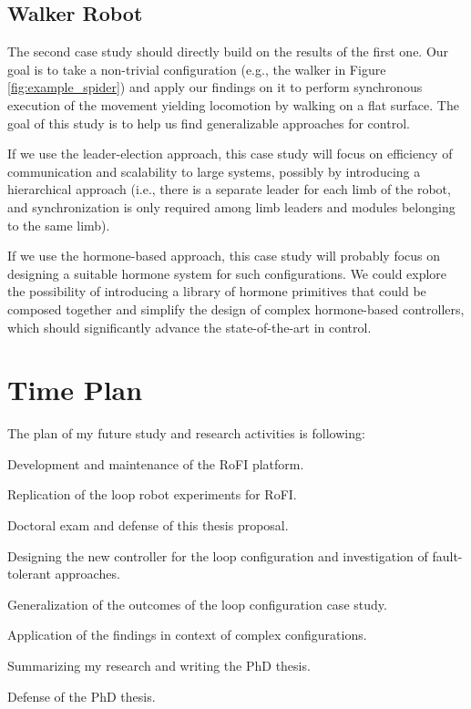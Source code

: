 \subsection{Walker Robot}

The second case study should directly build on the results of the first one. Our
goal is to take a non-trivial configuration (e.g., the walker in Figure
\ref{fig:example_spider}) and apply our findings on it to perform synchronous
execution of the movement yielding locomotion by walking on a flat surface. The
goal of this study is to help us find generalizable approaches for control.

If we use the leader-election approach, this case study will focus on efficiency
of communication and scalability to large systems, possibly by introducing a
hierarchical approach (i.e., there is a separate leader for each limb of the
robot, and synchronization is only required among limb leaders and modules
belonging to the same limb).

If we use the hormone-based approach, this case study will probably focus on
designing a suitable hormone system for such configurations. We could explore
the possibility of introducing a library of hormone primitives that could be
composed together and simplify the design of complex hormone-based controllers,
which should significantly advance the state-of-the-art in control.

\section{Time Plan}

The plan of my future study and research activities is following:

\begin{description}[style=nextline,leftmargin=0.8cm]
    \item [now -- January 2023]
        Development and maintenance of the RoFI platform.
    \item [now -- January 2021]
        Replication of the loop robot experiments for RoFI.
    \item [January 2021]
        Doctoral exam and defense of this thesis proposal.
    \item [February 2021 -- June 2021]
        Designing the new controller for the loop configuration and
        investigation of fault-tolerant approaches.
    \item [June 2021 -- December 2022]
        Generalization of the outcomes of the loop configuration case study.
    \item[January 2022 -- August 2022]
        Application of the findings in context of complex configurations.
    \item[September 2022 -- January 2023]
        Summarizing my research and writing the PhD thesis.
    \item[January 2023]
        Defense of the PhD thesis.
\end{description}
